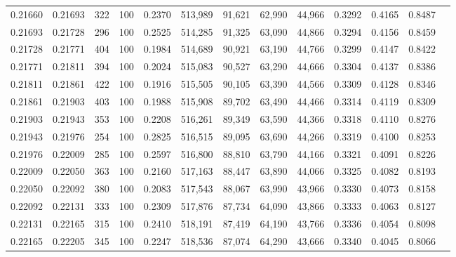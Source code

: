 \begin{tabular}{rrrrrrrrrrrrr}
0.21660 & 0.21693 &   322 & 100 &                                     0.2370 & 513,989 &  91,621 &  62,990 &  44,966 & 0.3292 & 0.4165 & 0.8487 \\
0.21693 & 0.21728 &   296 & 100 &                                     0.2525 & 514,285 &  91,325 &  63,090 &  44,866 & 0.3294 & 0.4156 & 0.8459 \\
0.21728 & 0.21771 &   404 & 100 &                                     0.1984 & 514,689 &  90,921 &  63,190 &  44,766 & 0.3299 & 0.4147 & 0.8422 \\
0.21771 & 0.21811 &   394 & 100 &                                     0.2024 & 515,083 &  90,527 &  63,290 &  44,666 & 0.3304 & 0.4137 & 0.8386 \\
0.21811 & 0.21861 &   422 & 100 &                                     0.1916 & 515,505 &  90,105 &  63,390 &  44,566 & 0.3309 & 0.4128 & 0.8346 \\
0.21861 & 0.21903 &   403 & 100 &                                     0.1988 & 515,908 &  89,702 &  63,490 &  44,466 & 0.3314 & 0.4119 & 0.8309 \\
0.21903 & 0.21943 &   353 & 100 &                                     0.2208 & 516,261 &  89,349 &  63,590 &  44,366 & 0.3318 & 0.4110 & 0.8276 \\
0.21943 & 0.21976 &   254 & 100 &                                     0.2825 & 516,515 &  89,095 &  63,690 &  44,266 & 0.3319 & 0.4100 & 0.8253 \\
0.21976 & 0.22009 &   285 & 100 &                                     0.2597 & 516,800 &  88,810 &  63,790 &  44,166 & 0.3321 & 0.4091 & 0.8226 \\
0.22009 & 0.22050 &   363 & 100 &                                     0.2160 & 517,163 &  88,447 &  63,890 &  44,066 & 0.3325 & 0.4082 & 0.8193 \\
0.22050 & 0.22092 &   380 & 100 &                                     0.2083 & 517,543 &  88,067 &  63,990 &  43,966 & 0.3330 & 0.4073 & 0.8158 \\
0.22092 & 0.22131 &   333 & 100 &                                     0.2309 & 517,876 &  87,734 &  64,090 &  43,866 & 0.3333 & 0.4063 & 0.8127 \\
0.22131 & 0.22165 &   315 & 100 &                                     0.2410 & 518,191 &  87,419 &  64,190 &  43,766 & 0.3336 & 0.4054 & 0.8098 \\
0.22165 & 0.22205 &   345 & 100 &                                     0.2247 & 518,536 &  87,074 &  64,290 &  43,666 & 0.3340 & 0.4045 & 0.8066 \\

\end{tabular}
